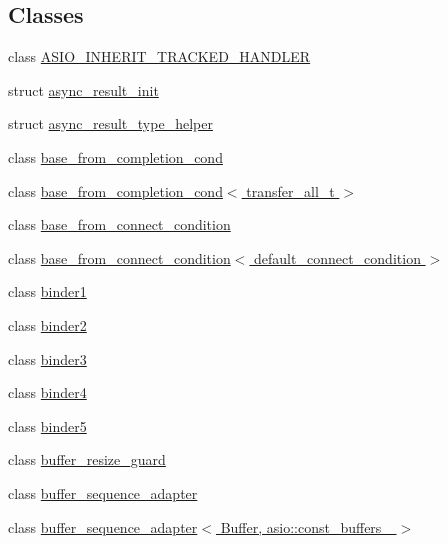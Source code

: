 \subsection*{Classes}
\begin{DoxyCompactItemize}
\item 
class \hyperlink{classasio_1_1detail_1_1_a_s_i_o___i_n_h_e_r_i_t___t_r_a_c_k_e_d___h_a_n_d_l_e_r}{A\+S\+I\+O\+\_\+\+I\+N\+H\+E\+R\+I\+T\+\_\+\+T\+R\+A\+C\+K\+E\+D\+\_\+\+H\+A\+N\+D\+L\+E\+R}
\item 
struct \hyperlink{structasio_1_1detail_1_1async__result__init}{async\+\_\+result\+\_\+init}
\item 
struct \hyperlink{structasio_1_1detail_1_1async__result__type__helper}{async\+\_\+result\+\_\+type\+\_\+helper}
\item 
class \hyperlink{classasio_1_1detail_1_1base__from__completion__cond}{base\+\_\+from\+\_\+completion\+\_\+cond}
\item 
class \hyperlink{classasio_1_1detail_1_1base__from__completion__cond_3_01transfer__all__t_01_4}{base\+\_\+from\+\_\+completion\+\_\+cond$<$ transfer\+\_\+all\+\_\+t $>$}
\item 
class \hyperlink{classasio_1_1detail_1_1base__from__connect__condition}{base\+\_\+from\+\_\+connect\+\_\+condition}
\item 
class \hyperlink{classasio_1_1detail_1_1base__from__connect__condition_3_01default__connect__condition_01_4}{base\+\_\+from\+\_\+connect\+\_\+condition$<$ default\+\_\+connect\+\_\+condition $>$}
\item 
class \hyperlink{classasio_1_1detail_1_1binder1}{binder1}
\item 
class \hyperlink{classasio_1_1detail_1_1binder2}{binder2}
\item 
class \hyperlink{classasio_1_1detail_1_1binder3}{binder3}
\item 
class \hyperlink{classasio_1_1detail_1_1binder4}{binder4}
\item 
class \hyperlink{classasio_1_1detail_1_1binder5}{binder5}
\item 
class \hyperlink{classasio_1_1detail_1_1buffer__resize__guard}{buffer\+\_\+resize\+\_\+guard}
\item 
class \hyperlink{classasio_1_1detail_1_1buffer__sequence__adapter}{buffer\+\_\+sequence\+\_\+adapter}
\item 
class \hyperlink{classasio_1_1detail_1_1buffer__sequence__adapter_3_01_buffer_00_01asio_1_1const__buffers__1_01_4}{buffer\+\_\+sequence\+\_\+adapter$<$ Buffer, asio\+::const\+\_\+buffers\+\_ $>$}

\end{DoxyCompactItemize}
